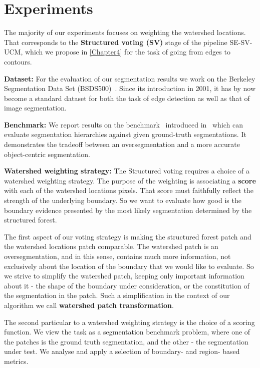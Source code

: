 \chapter{Experiments}
\label{Chapter5}
The majority of our experiments focuses on weighting the watershed locations. That corresponds to the \textbf{Structured voting (SV)} stage of the pipeline SE-SV-UCM, which we propose in \cref{Chapter4} for the task of going from edges to contours.

\textbf{Dataset:} For the evaluation of our segmentation results we work on the Berkeley Segmentation Data Set (BSDS500)~\cite{Arbelaez11}. Since its introduction in 2001, it has by now become a standard dataset for both the task of edge detection as well as that of image segmentation.

\textbf{Benchmark:} We report results on the benchmark~\cite{Galasso13Benchmark} introduced in~\cite{Galasso13} which can evaluate segmentation hierarchies against given ground-truth segmentations. It demonstrates the tradeoff between an oversegmentation and a more accurate object-centric segmentation.

\textbf{Watershed weighting strategy:} The Structured voting requires a choice of a watershed weighting strategy. The purpose of the weighting is associating a \textbf{score} with each of the watershed locations pixels. That score must faithfully reflect the strength of the underlying boundary. So we want to evaluate how good is the boundary evidence presented by the most likely segmentation determined by the structured forest. 

The first aspect of our voting strategy is making the structured forest patch and the watershed locations patch comparable. The watershed patch is an oversegmentation, and in this sense, contains much more information, not exclusively about the location of the boundary that we would like to evaluate. So we strive to simplify the watershed patch, keeping only important information about it - the shape of the boundary under consideration, or the constitution of the segmentation in the patch. Such a simplification in the context of our algorithm we call {\bf watershed patch transformation}. %

The second particular to a watershed weighting strategy is the choice of a scoring function. We view the task as a segmentation benchmark problem, where one of the patches is the ground truth segmentation, and the other - the segmentation under test. We analyse and apply a selection of boundary- and region- based metrics.

